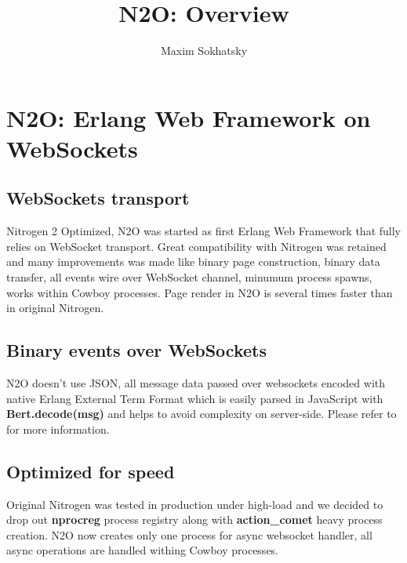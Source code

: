 \documentclass[11pt]{article}
\begin{document}
\title{N2O: Overview}
\author{Maxim Sokhatsky}

\paragraph{}
\section*{N2O: Erlang Web Framework on WebSockets}

\subsection*{WebSockets transport} 
Nitrogen 2 Optimized, N2O was started as first Erlang Web Framework
that fully relies on WebSocket transport. Great compatibility with Nitrogen
was retained and many improvements was made like binary page construction,
binary data transfer, all events wire over WebSocket channel, minumum process spawns,
works within Cowboy processes. Page render in N2O is several times faster
than in original Nitrogen.

\subsection*{Binary events over WebSockets}
N2O doesn't use JSON, all message data passed over websockets encoded with
native Erlang External Term Format which is easily parsed in JavaScript
with {\bf Bert.decode(msg)} and helps to avoid complexity on server-side.
Please refer to  for more information.

\subsection*{Optimized for speed}
Original Nitrogen was tested in production under high-load and we decided to drop out
{\bf nprocreg} process registry along with {\bf{action\_comet}} heavy process creation. N2O now creates
only one process for async websocket handler, all async operations are handled withing
Cowboy processes.
\end{document}
